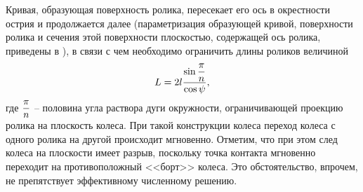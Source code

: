 Кривая, образующая поверхность ролика, пересекает его ось в окрестности острия и продолжается далее (параметризация образующей кривой, поверхности ролика и сечения этой поверхности плоскостью, содержащей ось ролика, приведены в \cite{Gfrerrer2008}), в связи с чем
необходимо ограничить длины роликов величиной
$$
L=2l\displaystyle\frac{\displaystyle \sin\displaystyle\frac{\displaystyle \pi}{\displaystyle n}}{\displaystyle \cos\psi},
$$
где $\displaystyle\frac{\displaystyle \pi}{\displaystyle n}$ -- половина угла раствора дуги окружности, ограничивающей проекцию ролика на плоскость колеса. При такой конструкции колеса переход колеса с одного ролика на другой происходит мгновенно.
Отметим, что при этом след колеса на плоскости имеет разрыв, поскольку точка контакта мгновенно переходит на противоположный <<борт>> колеса. Это обстоятельство, впрочем, не препятствует эффективному численному решению.

